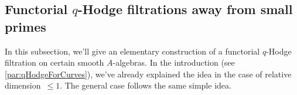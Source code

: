 \documentclass[DIV=12,numbers=enddot,leqno,bibliography=totoc]{scrartcl}
\begin{document}
	\subsection{Functorial \texorpdfstring{$q$}{q}-Hodge filtrations away from small primes}\label{subsec:CanonicalqHodgeSmooth}
	
	In this subsection, we'll give an elementary construction of a functorial $q$-Hodge filtration on certain smooth $A$-algebras. In the introduction (see \cref{par:qHodgeForCurves}), we've already explained the idea in the case of relative dimension~$\leqslant1$. The general case follows the same simple idea.
\end{document}
